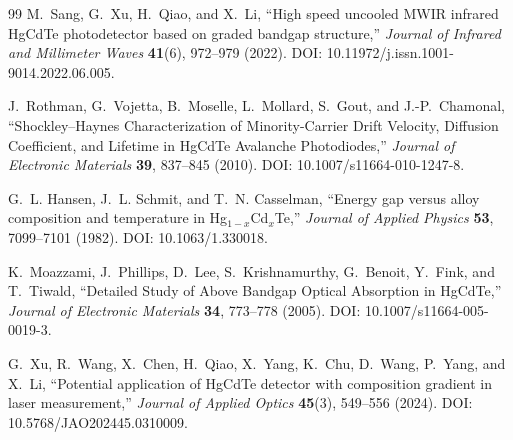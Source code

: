 \documentclass[11pt]{article}
\begin{document}
\begin{thebibliography}{99}
M.~Sang, G.~Xu, H.~Qiao, and X.~Li, ``High speed uncooled MWIR infrared HgCdTe photodetector based on graded bandgap structure,'' \emph{Journal of Infrared and Millimeter Waves} \textbf{41}(6), 972--979 (2022). DOI: 10.11972/j.issn.1001-9014.2022.06.005.

J.~Rothman, G.~Vojetta, B.~Moselle, L.~Mollard, S.~Gout, and J.-P.~Chamonal, ``Shockley--Haynes Characterization of Minority-Carrier Drift Velocity, Diffusion Coefficient, and Lifetime in HgCdTe Avalanche Photodiodes,'' \emph{Journal of Electronic Materials} \textbf{39}, 837--845 (2010). DOI: 10.1007/s11664-010-1247-8.

G.~L. Hansen, J.~L. Schmit, and T.~N. Casselman, ``Energy gap versus alloy composition and temperature in Hg$_{1-x}$Cd$_x$Te,'' \emph{Journal of Applied Physics} \textbf{53}, 7099--7101 (1982). DOI: 10.1063/1.330018.

K.~Moazzami, J.~Phillips, D.~Lee, S.~Krishnamurthy, G.~Benoit, Y.~Fink, and T.~Tiwald, ``Detailed Study of Above Bandgap Optical Absorption in HgCdTe,'' \emph{Journal of Electronic Materials} \textbf{34}, 773--778 (2005). DOI: 10.1007/s11664-005-0019-3.

G.~Xu, R.~Wang, X.~Chen, H.~Qiao, X.~Yang, K.~Chu, D.~Wang, P.~Yang, and X.~Li, ``Potential application of HgCdTe detector with composition gradient in laser measurement,'' \emph{Journal of Applied Optics} \textbf{45}(3), 549--556 (2024). DOI: 10.5768/JAO202445.0310009.

\end{thebibliography}
\end{document}
